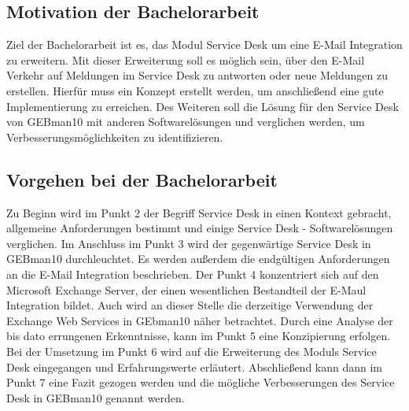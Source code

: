 \subsection{Motivation der Bachelorarbeit}
\noindent
Ziel der Bachelorarbeit ist es, das Modul Service Desk um eine E-Mail Integration zu erweitern. Mit dieser Erweiterung soll es möglich sein, über den E-Mail Verkehr auf Meldungen im Service Desk zu antworten oder neue Meldungen zu erstellen. Hierfür muss ein Konzept erstellt werden, um anschließend eine gute Implementierung zu erreichen.\newline
Des Weiteren soll die Lösung für den Service Desk von GEBman10 mit anderen Softwarelösungen und verglichen werden, um Verbesserungsmöglichkeiten zu identifizieren. 


\subsection{Vorgehen bei der Bachelorarbeit}
\noindent
Zu Beginn wird im Punkt 2 der Begriff Service Desk in einen Kontext gebracht, allgemeine Anforderungen bestimmt und einige Service Desk - Softwarelösungen verglichen. Im Anschluss im Punkt 3 wird der gegenwärtige Service Desk in GEBman10 durchleuchtet. Es werden außerdem die endgültigen Anforderungen an die E-Mail Integration beschrieben. Der Punkt 4 konzentriert sich auf den Microsoft Exchange Server, der einen wesentlichen Bestandteil der E-Maul Integration bildet. Auch wird an dieser Stelle die derzeitige Verwendung der Exchange Web Services in GEbman10 näher betrachtet.  Durch eine Analyse der bis dato errungenen Erkenntnisse, kann im Punkt 5 eine Konzipierung erfolgen. Bei der Umsetzung im Punkt 6 wird auf die Erweiterung des Moduls Service Desk eingegangen und Erfahrungswerte erläutert. Abschließend kann dann im Punkt 7 eine Fazit gezogen werden und die mögliche Verbesserungen des Service Desk in GEBman10 genannt werden.